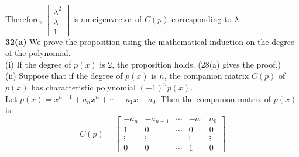 Therefore, $\begin{bmatrix}
	\lambda^2 \\ \lambda \\ 1
\end{bmatrix}$ is an eigenvector of $C(p)$ corresponding to $\lambda$. \\

\textbf{32(a)} We prove the proposition using the mathematical induction on the degree of the polynomial. \\

(i) If the degree of $p(x)$ is 2, the proposition holds. (28(a) gives the proof.) \\

(ii) Suppose that if the degree of $p(x)$ is $n$, the companion matrix $C(p)$ of $p(x)$ has characteristic polynomial $(-1)^np(x)$. \\
Let $p(x) = x^{n+1} + a_nx^n + \cdots + a_1x + a_0$. Then the companion matrix of $p(x)$ is \begin{equation*}
	C(p) = \begin{bmatrix}
		-a_n & -a_{n-1} & \cdots & -a_1 & a_0 \\
		1    & 0        & \cdots & 0    & 0   \\
		\vdots & \vdots &        & \vdots & \vdots \\
		0    & 0        & \cdots & 1      & 0
	\end{bmatrix}
\end{equation*}
